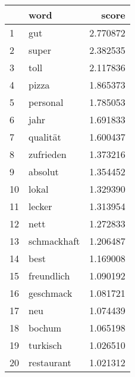 \begin{tabular}{llr}
\toprule
{} &          word &     score \\
\midrule
1  &           gut &  2.770872 \\
2  &         super &  2.382535 \\
3  &          toll &  2.117836 \\
4  &         pizza &  1.865373 \\
5  &      personal &  1.785053 \\
6  &          jahr &  1.691833 \\
7  &      qualität &  1.600437 \\
8  &     zufrieden &  1.373216 \\
9  &       absolut &  1.354452 \\
10 &         lokal &  1.329390 \\
11 &        lecker &  1.313954 \\
12 &          nett &  1.272833 \\
13 &   schmackhaft &  1.206487 \\
14 &          best &  1.169008 \\
15 &    freundlich &  1.090192 \\
16 &     geschmack &  1.081721 \\
17 &           neu &  1.074439 \\
18 &        bochum &  1.065198 \\
19 &      turkisch &  1.026510 \\
20 &    restaurant &  1.021312 \\
\bottomrule
\end{tabular}

